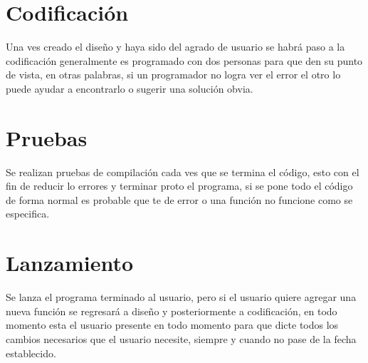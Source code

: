 \documentclass[letterpaper,oneside,openany,11pt]{book}
\begin{document}
 \section{Codificación}
 \noindent Una ves creado el diseño y haya sido del agrado de usuario se habrá paso a la codificación generalmente es programado con dos personas para que den su punto de vista, en otras palabras, si un programador no logra ver el error el otro lo puede ayudar a encontrarlo o sugerir una solución obvia.\\
 
 
 \section{Pruebas}
 \noindent  Se realizan pruebas de compilación cada ves que se termina el código, esto con el fin de reducir lo errores y terminar proto el programa, si se pone todo el código de forma normal es probable que te de error o una función no funcione como se especifica.\\


  \section{Lanzamiento}
 \noindent Se lanza el programa terminado al usuario, pero si el usuario quiere agregar una nueva función se regresará a diseño y posteriormente a codificación, en todo momento esta el usuario presente en todo momento para que dicte todos los cambios necesarios que el usuario necesite, siempre y cuando no pase de la fecha establecido.\\



\end{document}
